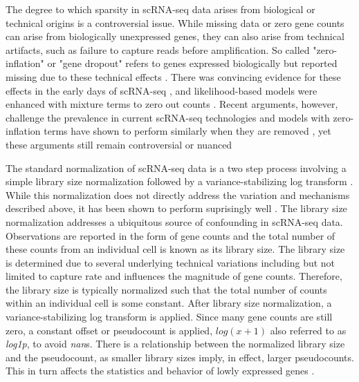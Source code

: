 The degree to which sparsity in scRNA-seq data arises from biological or technical origins is a controversial issue.
While missing data or zero gene counts can arise from biologically unexpressed genes, they can also arise from technical artifacts,
such as failure to capture reads before amplification.
So called "zero-inflation" or "gene dropout" refers to genes expressed biologically but reported missing due to these technical effects \cite{silverman2020}.
There was convincing evidence for these effects in the early days of scRNA-seq \cite{vallejos2017},
and likelihood-based models were enhanced with mixture terms to zero out counts \cite{pierson2015, dijk2018, lopez2018, huang2018, eraslan2019}.
Recent arguments, however, challenge the prevalence in current scRNA-seq technologies \cite{svensson2020,jiang2022}
and models with zero-inflation terms have shown to perform similarly when they are removed \cite{vieth2017},
yet these arguments still remain controversial or nuanced \cite{cao2021}

The standard normalization of scRNA-seq data is a two step process involving a simple library size normalization followed by a variance-stabilizing log transform \cite{luecken2019}.
While this normalization does not directly address the variation and mechanisms described above, it has been shown to perform suprisingly well \cite{ahlmann-eltze2023}.
The library size normalization addresses a ubiquitous source of confounding in scRNA-seq data.
Observations are reported in the form of gene counts and the total number of these counts from an individual cell is known as its library size.
The library size is determined due to several underlying technical variations including but not limited to capture rate \cite{lytal2020} and influences the magnitude of gene counts.
Therefore, the library size is typically normalized such that the total number of counts within an individual cell is some constant.
After library size normalization, a variance-stabilizing log transform is applied.
Since many gene counts are still zero, a constant offset or pseudocount is applied, $log(x + 1)$ also referred to as \textit{log1p}, to avoid \textit{nan}s.
There is a relationship between the normalized library size and the pseudocount, as smaller library sizes imply, in effect, larger pseudocounts.
This in turn affects the statistics and behavior of lowly expressed genes \cite{ahlmann-eltze2023}. %

